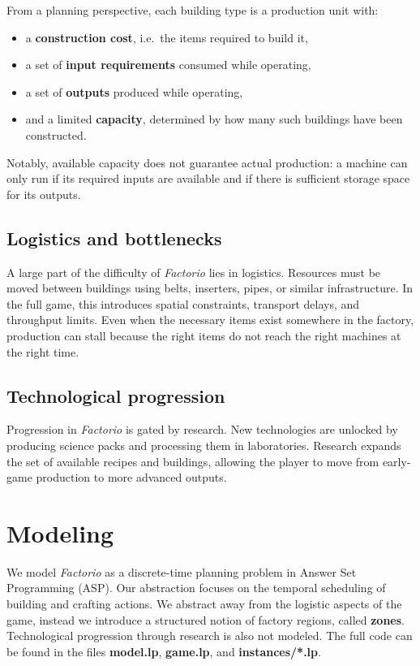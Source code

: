 \documentclass{article}
\newcommand{\factorio}[1]{\textit{#1}}
\begin{document}
From a planning perspective, each building type is a production unit with:
\begin{itemize}
    \item a \textbf{construction cost}, i.e.\ the items required to build it,
    \item a set of \textbf{input requirements} consumed while operating,
    \item a set of \textbf{outputs} produced while operating,
    \item and a limited \textbf{capacity}, determined by how many such buildings have been constructed.
\end{itemize}
Notably, available capacity does not guarantee actual production: a machine can only run if its required inputs are available and if there is sufficient storage space for its outputs.

\subsection{Logistics and bottlenecks}
A large part of the difficulty of \factorio{Factorio} lies in logistics. Resources must be moved between buildings using belts, inserters, pipes, or similar infrastructure. In the full game, this introduces spatial constraints, transport delays, and throughput limits. Even when the necessary items exist somewhere in the factory, production can stall because the right items do not reach the right machines at the right time.


\subsection{Technological progression}
Progression in \factorio{Factorio} is gated by research. New technologies are unlocked by producing science packs and processing them in laboratories. Research expands the set of available recipes and buildings, allowing the player to move from early-game production to more advanced outputs.

\section{Modeling}
We model \factorio{Factorio} as a discrete-time planning problem in Answer Set Programming (ASP). Our abstraction focuses on the temporal scheduling of building and crafting actions. We abstract away from the logistic aspects of the game, instead we introduce a structured notion of factory regions, called \textbf{zones}. Technological progression through research is also not modeled. The full code can be found in the files \textbf{model.lp}, \textbf{game.lp}, and \textbf{instances/*.lp}.
\end{document}
